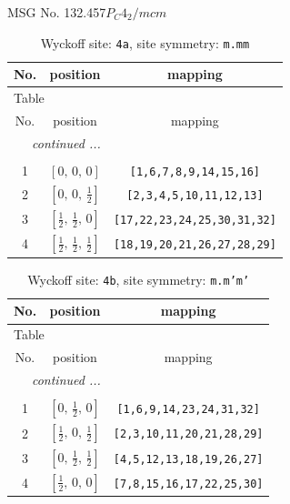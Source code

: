 \documentclass[fleqn,8pt]{jsarticle}
\begin{document}
\setcounter{MaxMatrixCols}{32}

\renewcommand{\tablename}{Table~}
\renewcommand{\figurename}{Figure~}
\begin{center}
\LARGE
MSG No. 132.457\quad$P_{C}4_{2}/mcm$
\end{center}
\renewcommand{\arraystretch}{1.2}
\begin{longtable}{ccc}
\caption{Wyckoff site: {\tt 4a}, site symmetry: {\tt m.mm}}
 \\
 \hline \hline
No. & position & mapping \\ \hline \endfirsthead

\multicolumn{2}{l}{\tablename\ \thetable{}} \\
 \hline \hline
No. & position & mapping \\ \hline \endhead

 \hline \hline
\multicolumn{2}{r}{\footnotesize\it continued ...} \\ \endfoot

 \hline \hline
\multicolumn{2}{r}{} \\ \endlastfoot

1 & $\left[ 0,\, 0,\, 0 \right]$ & {\tt [1,6,7,8,9,14,15,16]} \\ \hline
2 & $\left[ 0,\, 0,\, \frac{1}{2} \right]$ & {\tt [2,3,4,5,10,11,12,13]} \\ \hline
3 & $\left[ \frac{1}{2},\, \frac{1}{2},\, 0 \right]$ & {\tt [17,22,23,24,25,30,31,32]} \\ \hline
4 & $\left[ \frac{1}{2},\, \frac{1}{2},\, \frac{1}{2} \right]$ & {\tt [18,19,20,21,26,27,28,29]} \\
\end{longtable}
\renewcommand{\arraystretch}{1.2}
\begin{longtable}{ccc}
\caption{Wyckoff site: {\tt 4b}, site symmetry: {\tt m.m'm'}}
 \\
 \hline \hline
No. & position & mapping \\ \hline \endfirsthead

\multicolumn{2}{l}{\tablename\ \thetable{}} \\
 \hline \hline
No. & position & mapping \\ \hline \endhead

 \hline \hline
\multicolumn{2}{r}{\footnotesize\it continued ...} \\ \endfoot

 \hline \hline
\multicolumn{2}{r}{} \\ \endlastfoot

1 & $\left[ 0,\, \frac{1}{2},\, 0 \right]$ & {\tt [1,6,9,14,23,24,31,32]} \\ \hline
2 & $\left[ \frac{1}{2},\, 0,\, \frac{1}{2} \right]$ & {\tt [2,3,10,11,20,21,28,29]} \\ \hline
3 & $\left[ 0,\, \frac{1}{2},\, \frac{1}{2} \right]$ & {\tt [4,5,12,13,18,19,26,27]} \\ \hline
4 & $\left[ \frac{1}{2},\, 0,\, 0 \right]$ & {\tt [7,8,15,16,17,22,25,30]} \\
\end{longtable}
\end{document}
